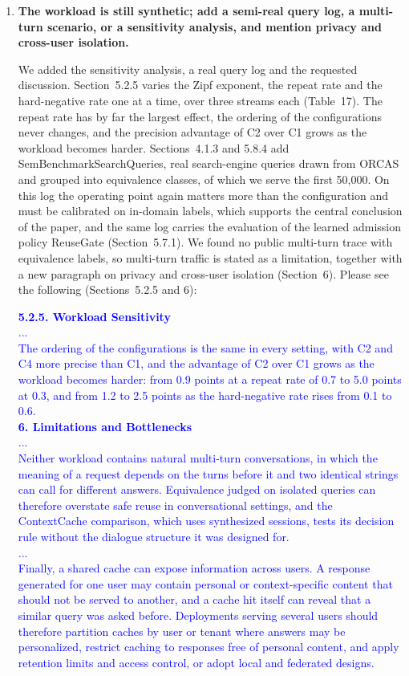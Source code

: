 \documentclass[11pt]{article}
\begin{document}
\begin{enumerate}[leftmargin=*, itemsep=1.2em]
\item \textbf{The workload is still synthetic; add a semi-real query log, a multi-turn scenario, or a sensitivity analysis, and mention privacy and cross-user isolation.}

We added the sensitivity analysis, a real query log and the requested discussion. Section~5.2.5 varies the Zipf exponent, the repeat rate and the hard-negative rate one at a time, over three streams each (Table~17). The repeat rate has by far the largest effect, the ordering of the configurations never changes, and the precision advantage of C2 over C1 grows as the workload becomes harder. Sections~4.1.3 and 5.8.4 add SemBenchmarkSearchQueries, real search-engine queries drawn from ORCAS and grouped into equivalence classes, of which we serve the first 50,000. On this log the operating point again matters more than the configuration and must be calibrated on in-domain labels, which supports the central conclusion of the paper, and the same log carries the evaluation of the learned admission policy ReuseGate (Section~5.7.1). We found no public multi-turn trace with equivalence labels, so multi-turn traffic is stated as a limitation, together with a new paragraph on privacy and cross-user isolation (Section~6). Please see the following (Sections~5.2.5 and 6):

\textcolor{blue}{\textbf{5.2.5. Workload Sensitivity}\\
...\\
The ordering of the configurations is the same in every setting, with C2 and C4 more precise than C1, and the advantage of C2 over C1 grows as the workload becomes harder: from 0.9 points at a repeat rate of 0.7 to 5.0 points at 0.3, and from 1.2 to 2.5 points as the hard-negative rate rises from 0.1 to 0.6.\\
\textbf{6. Limitations and Bottlenecks}\\
...\\
Neither workload contains natural multi-turn conversations, in which the meaning of a request depends on the turns before it and two identical strings can call for different answers. Equivalence judged on isolated queries can therefore overstate safe reuse in conversational settings, and the ContextCache comparison, which uses synthesized sessions, tests its decision rule without the dialogue structure it was designed for.\\
...\\
Finally, a shared cache can expose information across users. A response generated for one user may contain personal or context-specific content that should not be served to another, and a cache hit itself can reveal that a similar query was asked before. Deployments serving several users should therefore partition caches by user or tenant where answers may be personalized, restrict caching to responses free of personal content, and apply retention limits and access control, or adopt local and federated designs.}

\end{enumerate}
\end{document}

